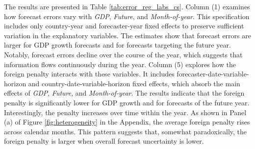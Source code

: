 The results are presented in Table \ref{tab:error_reg_labs_cs}. Column (1) examines how forecast errors vary with \textit{GDP}, \textit{Future}, and \textit{Month-of-year}. This specification includes only country-year and forecaster-year fixed effects to preserve sufficient variation in the explanatory variables. The estimates show that forecast errors are larger for GDP growth forecasts and for forecasts targeting the future year. Notably, forecast errors decline over the course of the year, which suggests that information flows continuously during the year. Column (5) explores how the foreign penalty interacts with these variables. It includes forecaster-date-variable-horizon and country-date-variable-horizon fixed effects, which absorb the main effects of \textit{GDP}, \textit{Future}, and \textit{Month-of-year}. The results indicate that the foreign penalty is significantly lower for GDP growth and for forecasts of the future year. Interestingly, the penalty increases over time within the year. As shown in Panel (a) of Figure \ref{fig:heterogeneity} in the Appendix, the average foreign penalty rises across calendar months. This pattern suggests that, somewhat paradoxically, the foreign penalty is larger when overall forecast uncertainty is lower.






